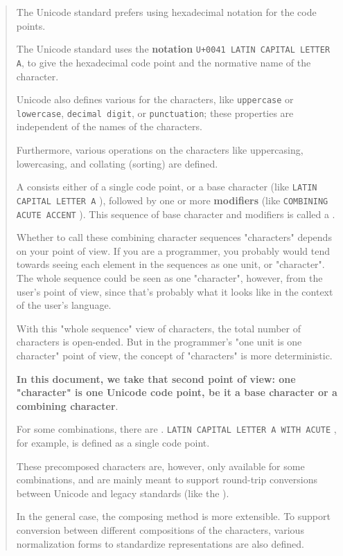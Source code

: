 \begin{htmlonly}
\begin{it}
\begin{quote}
The Unicode standard prefers using hexadecimal notation for the code
points. 

The Unicode standard uses the
{\bf notation} \verb|U+0041 LATIN CAPITAL LETTER A|, to give the hexadecimal code
point and the normative name of the character.

Unicode also defines various  for the characters, like
\verb"uppercase" or \verb"lowercase", \verb"decimal digit", or \verb"punctuation"; 
these
properties are independent of the names of the characters. 

Furthermore,
various operations on the characters like uppercasing, lowercasing,
and collating (sorting) are defined.

A  consists either of a single code point, or a
base character (like \verb|LATIN CAPITAL LETTER A| ), followed by one or more
{\bf modifiers} (like \verb|COMBINING ACUTE ACCENT| ). This sequence of base character
and modifiers is called a .

Whether to call these combining character sequences "characters" depends on your point of view. 
If you are a programmer, you probably would tend towards seeing each element in the sequences as one unit, or "character". 
The whole sequence could be seen as one "character", however, from the user's point of view, 
since that's probably what it looks like in the context of the user's language.

With this "whole sequence" view of characters, the total number
of characters is open-ended. But in the programmer's "one unit is
one character" point of view, the concept of "characters" is more
deterministic. 

{\bf In this document, we take that second point of view:
one "character" is one Unicode code point, be it a base character or a
combining character}.

For some combinations, there are . 
\verb|LATIN CAPITAL LETTER A WITH ACUTE| , for example, is defined as a single code
point. 

These precomposed characters are, however, only available for
some combinations, and are mainly meant to support round-trip conversions
between Unicode and legacy standards (like the ). 

In the general
case, the composing method is more extensible. To support conversion
between different compositions of the characters, various normalization
forms to standardize representations are also defined.


\end{quote}
\end{it}
\end{htmlonly}
